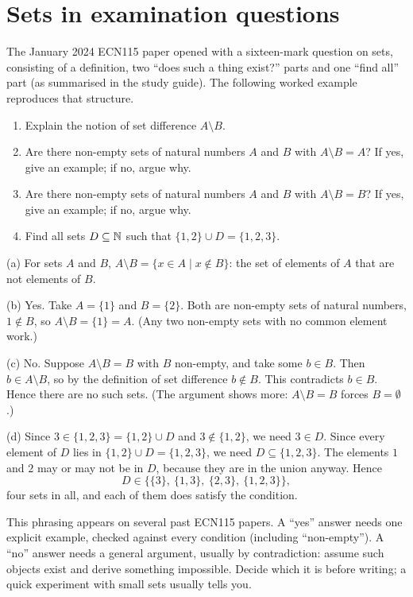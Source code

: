\section{Sets in examination questions}\label{sec:sets-exam}

The January 2024 ECN115 paper opened with a sixteen-mark question on sets, consisting of a definition,
two ``does such a thing exist?'' parts and one ``find all'' part (as summarised in the study guide). The
following worked example reproduces that structure.

\begin{example}
\begin{enumerate}
  \item Explain the notion of set difference $A\setminus B$.
  \item Are there non-empty sets of natural numbers $A$ and $B$ with $A\setminus B=A$? If yes, give an
  example; if no, argue why.
  \item Are there non-empty sets of natural numbers $A$ and $B$ with $A\setminus B=B$? If yes, give an
  example; if no, argue why.
  \item Find all sets $D\subseteq\mathbb{N}$ such that $\{1,2\}\cup D=\{1,2,3\}$.
\end{enumerate}
\solution
(a) For sets $A$ and $B$, $A\setminus B=\{x\in A\mid x\notin B\}$: the set of elements of $A$ that are not
elements of $B$.

(b) Yes. Take $A=\{1\}$ and $B=\{2\}$. Both are non-empty sets of natural numbers, $1\notin B$, so
$A\setminus B=\{1\}=A$. (Any two non-empty sets with no common element work.)

(c) No. Suppose $A\setminus B=B$ with $B$ non-empty, and take some $b\in B$. Then $b\in A\setminus B$, so by
the definition of set difference $b\notin B$. This contradicts $b\in B$. Hence there are no such sets. (The
argument shows more: $A\setminus B=B$ forces $B=\emptyset$.)

(d) Since $3\in\{1,2,3\}=\{1,2\}\cup D$ and $3\notin\{1,2\}$, we need $3\in D$. Since every element of $D$
lies in $\{1,2\}\cup D=\{1,2,3\}$, we need $D\subseteq\{1,2,3\}$. The elements $1$ and $2$ may or may not be
in $D$, because they are in the union anyway. Hence
\[
D\in\big\{\{3\},\ \{1,3\},\ \{2,3\},\ \{1,2,3\}\big\},
\]
four sets in all, and each of them does satisfy the condition.
\end{example}

\begin{examtip}
This phrasing appears on several past ECN115 papers. A ``yes'' answer needs one explicit example,
checked against every condition (including ``non-empty''). A ``no'' answer needs a general argument,
usually by contradiction: assume such objects exist and derive something impossible. Decide which it is
before writing; a quick experiment with small sets usually tells you.
\end{examtip}

